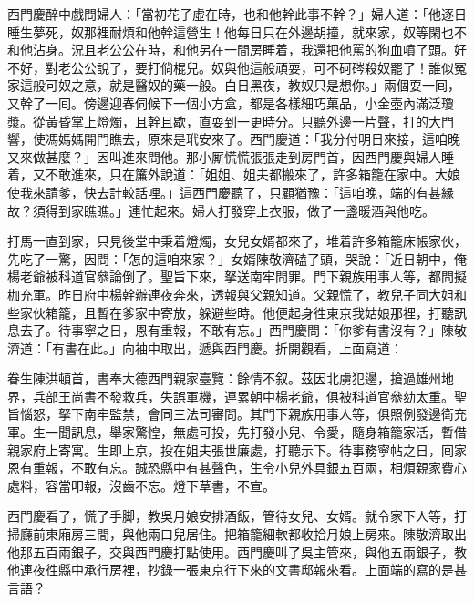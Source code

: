 西門慶醉中戲問婦人：「當初花子虛在時，也和他幹此事不幹？」婦人道：「他逐日睡生夢死，奴那裡耐煩和他幹這營生！他每日只在外邊胡撞，就來家，奴等閑也不和他沾身。況且老公公在時，和他另在一間房睡着，我還把他罵的狗血噴了頭。好不好，對老公公說了，{}要打倘棍兒。奴與他這般頑耍，可不砢硶殺奴罷了！誰似冤家這般可奴之意，就是醫奴的藥一般。白日黑夜，教奴只是想你。」兩個耍一囘，又幹了一囘。傍邊迎春伺候下一個小方盒，都是各樣細巧菓品，小金壺內滿泛瓊漿。從黃昏掌上燈燭，且幹且歇，直耍到一更時分。只聽外邊一片聲，打的大門響，使馮媽媽開門瞧去，原來是玳安來了。西門慶道：「我分付明日來接，這咱晚又來做甚麼？」因叫進來問他。那小厮慌慌張張走到房門首，因西門慶與婦人睡着，又不敢進來，只在簾外說道：「姐姐、姐夫都搬來了，許多箱籠在家中。大娘使我來請爹，快去計較話哩。」這西門慶聽了，只顧猶豫：「這咱晚，端的有甚緣故？須得到家瞧瞧。」連忙起來。婦人打發穿上衣服，做了一盞暖酒與他吃。

打馬一直到家，只見後堂中秉着燈燭，女兒女婿都來了，堆着許多箱籠床帳家伙，先吃了一驚，因問：「怎的這咱來家？」女婿陳敬濟磕了頭，哭說：「近日朝中，俺楊老爺被科道官叅論倒了。聖旨下來，拏送南牢問罪。門下親族用事人等，都問擬枷充軍。昨日府中楊幹辦連夜奔來，透報與父親知道。父親慌了，教兒子同大姐和些家伙箱籠，且暫在爹家中寄放，躲避些時。他便起身徃東京我姑娘那裡，打聽訊息去了。待事寧之日，恩有重報，不敢有忘。」西門慶問：「你爹有書沒有？」陳敬濟道：「有書在此。」向袖中取出，遞與西門慶。折開觀看，上面寫道：

\begin{myquote}[\markfont]
眷生陳洪頓首，書奉大德西門親家臺覽：餘情不叙。茲因北虜犯邊，搶過雄州地界，兵部王尚書不發救兵，失誤軍機，連累朝中楊老爺，{}俱被科道官叅劾太重。聖旨惱怒，拏下南牢監禁，會同三法司審問。其門下親族用事人等，俱照例發邊衛充軍。生一聞訊息，舉家驚惶，無處可投，先打發小兒、令愛，隨身箱籠家活，暫借親家府上寄寓。生即上京，投在姐夫張世廉處，打聽示下。待事務寧帖之日，囘家恩有重報，不敢有忘。誠恐縣中有甚聲色，{}生令小兒外具銀五百兩，相煩親家費心處料，容當叩報，沒齒不忘。燈下草書，不宣。

\end{myquote}

西門慶看了，慌了手脚，教吳月娘安排酒飯，管待女兒、女婿。就令家下人等，打掃廳前東廂房三間，與他兩口兒居住。把箱籠細軟都收拾月娘上房來。{}陳敬濟取出他那五百兩銀子，交與西門慶打點使用。西門慶叫了吳主管來，與他五兩銀子，教他連夜徃縣中承行房裡，抄錄一張東京行下來的文書邸報來看。上面端的寫的是甚言語？

